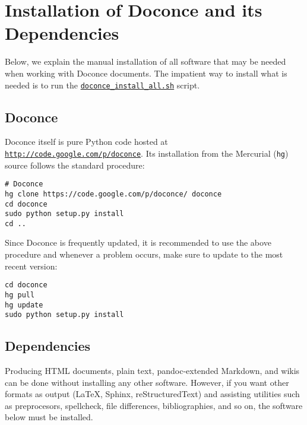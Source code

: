 \documentclass[%
oneside,                 %
final,                   %
10pt]{article}
\begin{document}
\section{Installation of Doconce and its Dependencies}

Below, we explain the manual installation of all software that may be
needed when working with Doconce documents.
The impatient way to install what is needed is to run the
\href{{doconce_install_all.sh}}{\nolinkurl{doconce_install_all.sh}} script.

\subsection{Doconce}

Doconce itself is pure Python code hosted at \href{{http://code.google.com/p/doconce}}{\nolinkurl{http://code.google.com/p/doconce}}.  Its installation from the
Mercurial ({\fontsize{10pt}{10pt}\Verb!hg!}) source follows the standard procedure:
\vspace{4pt}
\begin{Verbatim}[numbers=none,frame=lines,fontsize=\fontsize{9pt}{9pt},labelposition=topline,framesep=2.5mm,framerule=0.7pt]
# Doconce
hg clone https://code.google.com/p/doconce/ doconce
cd doconce
sudo python setup.py install
cd ..
\end{Verbatim}
Since Doconce is frequently updated, it is recommended to use the
above procedure and whenever a problem occurs, make sure to
update to the most recent version:
\vspace{4pt}
\begin{Verbatim}[numbers=none,frame=lines,fontsize=\fontsize{9pt}{9pt},labelposition=topline,framesep=2.5mm,framerule=0.7pt]
cd doconce
hg pull
hg update
sudo python setup.py install
\end{Verbatim}


\subsection{Dependencies}

Producing HTML documents, plain text, pandoc-extended Markdown,
and wikis can be done without installing any other
software. However, if you want other formats as output
({\LaTeX}, Sphinx, reStructuredText) and assisting utilities such
as preprocesors, spellcheck, file differences, bibliographies,
and so on, the software below must be installed.

\end{document}
